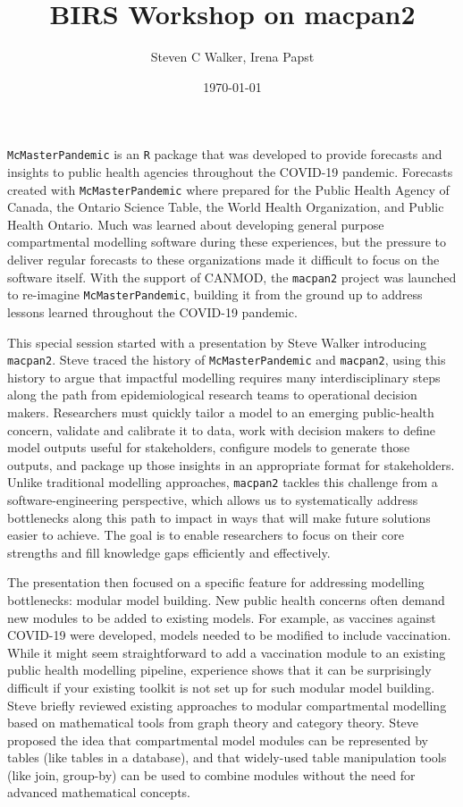 \documentclass{article}
\title{BIRS Workshop on macpan2}
\date{\today}
\author{Steven C Walker, Irena Papst}
\newcommand{\macpan}{\texttt{macpan2}\xspace}
\newcommand{\macpanOrig}{\texttt{McMasterPandemic}\xspace}
\newcommand{\R}{\texttt{R}\xspace}
\begin{document}
  \maketitle

  \macpanOrig is an \R package that was developed to provide forecasts and insights to public health agencies throughout the COVID-19 pandemic. Forecasts created with \macpanOrig where prepared for the Public Health Agency of Canada, the Ontario Science Table, the World Health Organization, and Public Health Ontario. Much was learned about developing general purpose compartmental modelling software during these experiences, but the pressure to deliver regular forecasts to these organizations made it difficult to focus on the software itself. With the support of CANMOD, the \macpan project was launched to re-imagine \macpanOrig, building it from the ground up to address lessons learned throughout the COVID-19 pandemic.

  This special session started with a presentation by Steve Walker introducing \macpan. Steve traced the history of \macpanOrig and \macpan, using this history to argue that impactful modelling requires many interdisciplinary steps along the path from epidemiological research teams to operational decision makers. Researchers must quickly tailor a model to an emerging public-health concern, validate and calibrate it to data, work with decision makers to define model outputs useful for stakeholders, configure models to generate those outputs, and package up those insights in an appropriate format for stakeholders. Unlike traditional modelling approaches, \macpan tackles this challenge from a software-engineering perspective, which allows us to systematically address bottlenecks along this path to impact in ways that will make future solutions easier to achieve. The goal is to enable researchers to focus on their core strengths and fill knowledge gaps efficiently and effectively.

  The presentation then focused on a specific feature for addressing modelling bottlenecks: modular model building. New public health concerns often demand new modules to be added to existing models. For example, as vaccines against COVID-19 were developed, models needed to be modified to include vaccination. While it might seem straightforward to add a vaccination module to an existing public health modelling pipeline, experience shows that it can be surprisingly difficult if your existing toolkit is not set up for such modular model building. Steve briefly reviewed existing approaches to modular compartmental modelling based on mathematical tools from graph theory and category theory. Steve proposed the idea that compartmental model modules can be represented by tables (like tables in a database), and that widely-used table manipulation tools (like join, group-by) can be used to combine modules without the need for advanced mathematical concepts.
\end{document}
